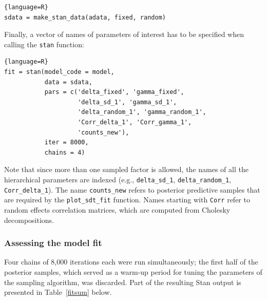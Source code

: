 \documentclass[a4paper,man,apacite,floatsintext]{apa6}
\newcommand{\code}[1]{\texttt{#1}}
\begin{document}
\begin{lstlisting}{language=R}
sdata = make_stan_data(adata, fixed, random)
\end{lstlisting}

Finally, a vector of names of parameters of interest has to be
specified when calling the \code{stan} function:

\begin{lstlisting}{language=R}
fit = stan(model_code = model,
           data = sdata,
           pars = c('delta_fixed', 'gamma_fixed',
                    'delta_sd_1', 'gamma_sd_1',
                    'delta_random_1', 'gamma_random_1',
                    'Corr_delta_1', 'Corr_gamma_1',
                    'counts_new'),
           iter = 8000,
           chains = 4)
\end{lstlisting}

Note that since more than one sampled factor is allowed, the names of
all the hierarchical parameters are indexed (e.g., \code{delta\_sd\_1},
\code{delta\_random\_1}, \code{Corr\_delta\_1}). The name
\code{counts\_new} refers to posterior predictive samples that are
required by the \code{plot\_sdt\_fit} function. Names starting with
\code{Corr} refer to random effects correlation matrices, which are
computed from Cholesky decompositions.

\subsubsection{Assessing the model fit}

Four chains of 8,000 iterations each were run simultaneously; the
first half of the posterior samples, which served as a warm-up period
for tuning the parameters of the sampling algorithm, was
discarded. Part of the resulting Stan output is presented in
Table~\ref{fitsum} below.
\end{document}
